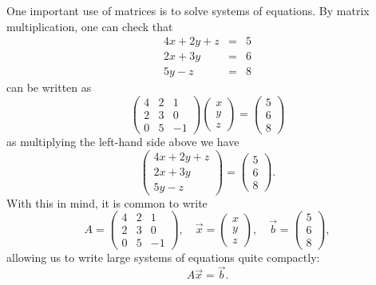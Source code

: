 \documentclass{ximera}
\begin{document}
One important use of matrices is to solve systems of equations. By matrix multiplication, one can check that
\begin{eqnarray*}
  4x+2y+z &=& 5\\
  2x+3y &=& 6\\
  5y -z &=& 8
\end{eqnarray*}
can be written as
\[
  \begin{pmatrix}
    4 & 2 & 1 \\
    2 & 3 & 0\\
    0 & 5 & -1
  \end{pmatrix}
  \begin{pmatrix}
    x \\
    y\\
    z
  \end{pmatrix}
  = \begin{pmatrix}
    5 \\
    6\\
    8
  \end{pmatrix}
\]
as multiplying the left-hand side above we have
\[
  \begin{pmatrix}
    4x+2y+z\\
    2x+3y\\
    5y-z
  \end{pmatrix} = \begin{pmatrix}
    5\\
    6\\
    8
  \end{pmatrix}.
\]
With this in mind, it is common to write
\[
  A = \begin{pmatrix}
    4 & 2 & 1 \\
    2 & 3 & 0\\
    0 & 5 & -1
  \end{pmatrix},\quad\vec x = \begin{pmatrix} x \\ y \\ z\end{pmatrix},
  \quad\vec b = \begin{pmatrix} 5 \\6\\8\end{pmatrix},
\]
allowing us to write large systems of equations quite compactly:
\[
  A\vec{x} = \vec{b}.
\]
\end{document}
